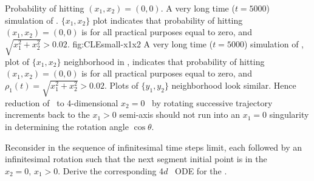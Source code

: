 
{Probability of hitting $(x_1,x_2) =(0,0)$.}{
%
{}{
A very long time ($t=5000$) simulation of \cLf. $\{x_1,x_2\}$ plot indicates
that probability of hitting $(x_1,x_2) =(0,0)$ is for all practical purposes
equal to zero, and $\sqrt{x_1^2+x_2^2} > 0.02$.
}
{fig:CLEsmall-x1x2}
%
A very long time ($t=5000$) simulation of \cLf, plot of
$\{x_1,x_2\}$  neighborhood in ,
indicates that probability of hitting $(x_1,x_2) =(0,0)$ is
for all practical purposes equal to zero, and
$\rho_1(t)=\sqrt{x_1^2+x_2^2} > 0.02$. Plots of $\{y_1,y_2\}$
neighborhood look similar.
Hence reduction of \statesp\ to 4-dimensional $x_2=0$ \reducedsp\ by rotating successive trajectory increments back
to the $x_1>0$ semi-axis should not run into an $x_1 =0$
singularity in determining the rotation angle $\cos\theta$.
    } %


{\label{exer:csectionCLeODE}
Reconsider  in the sequence of
infinitesimal time steps limit, each followed by an
infinitesimal rotation such that the next segment initial
point is in the {\slice} $x_2=0,\,x_1>0$. Derive the
corresponding 4$d$ \reducedsp\ ODE for the \cLf.
    } %

